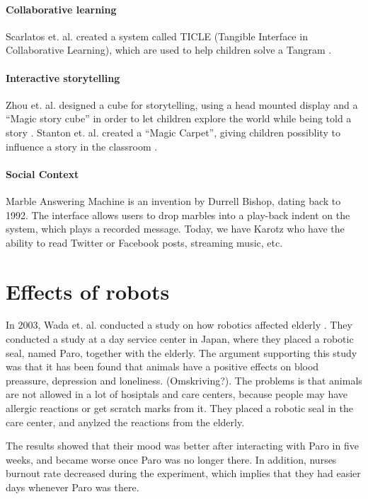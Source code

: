 \paragraph{Collaborative learning}
Scarlatos et. al. created a system called TICLE (Tangible Interface in Collaborative Learning), which are used to help children solve a Tangram \cite{scarlatos1999ticle}.  

\paragraph{Interactive storytelling}
Zhou et. al. designed a cube for storytelling, using a head mounted display and a ``Magic story cube'' in order to let children explore the world while being told a story \cite{zhou2004magic}. Stanton et. al. created a ``Magic Carpet'', giving children possiblity to influence a story in the classroom \cite{stanton2001classroom}. 
 
\paragraph{Social Context}
Marble Answering Machine is an invention by Durrell Bishop, dating back to 1992. The interface allows users to drop marbles into a play-back indent on the system, which plays a recorded message. Today, we have Karotz who have the ability to read Twitter or Facebook posts, streaming music, etc.   

\section{Effects of robots}

In 2003, Wada et. al. conducted a study on how robotics affected elderly \cite{wada2004effects}. They conducted a study at a day service center in Japan, where they placed a robotic seal, named Paro, together with the elderly. The argument supporting this study was that it has been found that animals have a positive effects on blood preassure, depression and loneliness. (Omskriving?). The problems is that animals are not allowed in a lot of hosiptals and care centers, because people may have allergic reactions or get scratch marks from it. They placed a robotic seal in the care center, and anylzed the reactions from the elderly. 

The results showed that their mood was better after interacting with Paro in five weeks, and became worse once Paro was no longer there. In addition, nurses burnout rate decreased during the experiment, which implies that they had easier days whenever Paro was there.          

